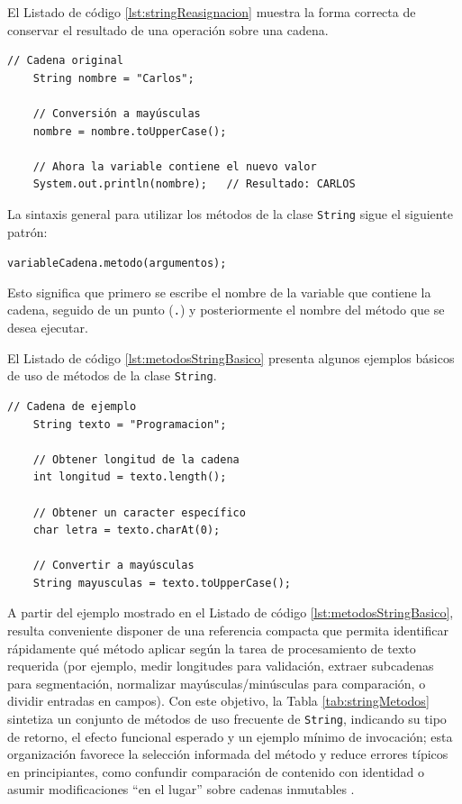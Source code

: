 \documentclass[12pt,twoside]{book}
\begin{document}
						\noindent
						El Listado de código \ref{lst:stringReasignacion} muestra la forma correcta de conservar el resultado de una operación sobre una cadena.
						
						\begin{lstlisting}[style=Java,caption={Guardar el resultado de una operación sobre String.},label={lst:stringReasignacion}]
	// Cadena original
	String nombre = "Carlos";
	
	// Conversión a mayúsculas
	nombre = nombre.toUpperCase();
	
	// Ahora la variable contiene el nuevo valor
	System.out.println(nombre);   // Resultado: CARLOS \end{lstlisting}
						
						\noindent
						La sintaxis general para utilizar los métodos de la clase \texttt{String} sigue el siguiente patrón:
						
						\begin{center}
							\texttt{variableCadena.metodo(argumentos);}
						\end{center}
						
						\noindent
						Esto significa que primero se escribe el nombre de la variable que contiene la cadena, seguido de un punto (\texttt{.}) y posteriormente el nombre del método que se desea ejecutar.
						
						El Listado de código \ref{lst:metodosStringBasico} presenta algunos ejemplos básicos de uso de métodos de la clase \texttt{String}.
						
						\begin{lstlisting}[style=Java,caption={Uso básico de métodos de la clase String.},label={lst:metodosStringBasico}]
	// Cadena de ejemplo
	String texto = "Programacion";
	
	// Obtener longitud de la cadena
	int longitud = texto.length();
	
	// Obtener un caracter específico
	char letra = texto.charAt(0);
	
	// Convertir a mayúsculas
	String mayusculas = texto.toUpperCase(); \end{lstlisting}
						
						\noindent
						A partir del ejemplo mostrado en el Listado de código \ref{lst:metodosStringBasico}, resulta conveniente disponer de una referencia compacta que permita identificar rápidamente qué método aplicar según la tarea de procesamiento de texto requerida (por ejemplo, medir longitudes para validación, extraer subcadenas para segmentación, normalizar mayúsculas/minúsculas para comparación, o dividir entradas en campos). Con este objetivo, la Tabla \ref{tab:stringMetodos} sintetiza un conjunto de métodos de uso frecuente de \texttt{String}, indicando su tipo de retorno, el efecto funcional esperado y un ejemplo mínimo de invocación; esta organización favorece la selección informada del método y reduce errores típicos en principiantes, como confundir comparación de contenido con identidad o asumir modificaciones “en el lugar” sobre cadenas inmutables \cite{Gosling2014JavaLanguageSpec,Bloch2018EffectiveJava,Qian2018Students}.
						
\end{document}
